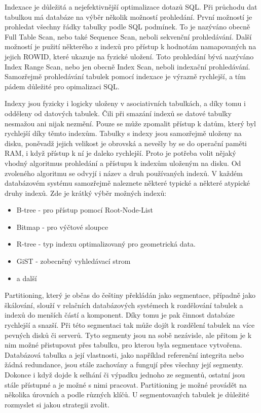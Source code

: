 \documentclass[12pt]{article}
\begin{document}
Indexace je důležitá a nejefektivnější optimalizace dotazů SQL. Při průchodu dat tabulkou má databáze na výběr několik možností prohledání. První možností je prohledat všechny řádky tabulky podle SQL podmínek. To je nazýváno obecně Full Table Scan, nebo také Sequence Scan, neboli sekvenční prohledávání. Další možností je pužití některého z indexů pro přístup k hodnotám namapovaných na jejich ROWID, které ukazuje na fyzické uložení. Toto prohledání bývá nazýváno Index Range Scan, nebo jen obecně Index Scan, neboli indexační prohledávání. Samozřejmě prohledávání tabulek pomocí indexace je výrazně rychlejší, a tím pádem důležité pro opimalizaci SQL. \cite{optimalizace-sql}

Indexy jsou fyzicky i logicky uloženy v asociativních tabulkách, a díky tomu i odděleny od datových tabulek. Čili při smazání indexů se datové tabulky nesmažou ani nijak nezmění. Pouze se může zpomalit přístup k datům, který byl rychlejší díky těmto indexům. Tabulky s indexy jsou samozřejmě uloženy na disku, poněvadž jejich velikost je obrovská a nevešly by se do operační paměti RAM, i když přístup k ní je daleko rychlejší. Proto je potřeba volit nějaký vhodný algoritmus prohledání a přístupu k indexům uloženým na disku. Od zvoleného algoritmu se odvyjí i název a druh používaných indexů. V každém databázovém systému samozřejmě naleznete některé typické a některé atypické druhy indexů. \cite{optimalizace-sql} Zde je krátký výběr možných indexů:

\begin{itemize}
\item B-tree - pro přístup pomocí Root-Node-List
\item Bitmap - pro výčtové sloupce
\item R-tree - typ indexu optimalizovaný pro geometrická data.
\item GiST - zobecněný vyhledávací strom
\item a další
\end{itemize}


Partitioning, který je občas do češtiny překládán jako segmentace, případně jako škálování, slouží v relačních databázových systémech k rozdělování tabulek a indexů do menších částí a komponent. Díky tomu je pak činnost databáze rychlejší a snazší. Při této segmentaci tak může dojít k rozdělení tabulek na více pevných disků či serverů. Tyto segmenty jsou na sobě nezávisle, ale přitom je k nim možné přistupovat přes tabulku, pro kterou byla segmentace vytvořena. Databázová tabulka a její vlastnosti, jako například referenční integrita nebo žádná redundance, jsou stále zachovány a fungují přes všechny její segmenty. Dokonce i když dojde k selhání či výpadku jednoho ze segmentů, ostatní jsou stále přístupné a je možné s nimi pracovat. Partitioning je možné provádět na několika úrovních a podle různých klíčů. U segmentovaných tabulek je důležité rozmyslet si jakou strategii zvolit. 
\end{document}
